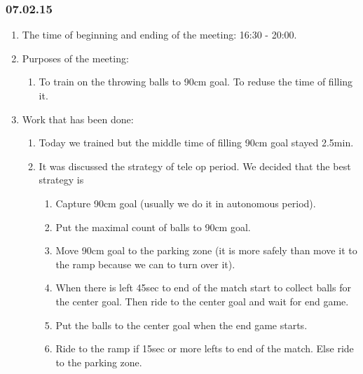 \subsubsection{07.02.15}
\begin{enumerate}
	
	\item The time of beginning and ending of the meeting: 16:30 - 20:00.
	
	\item Purposes of the meeting:
	\begin{enumerate}
		
		\item To train on the throwing balls to 90cm goal. To reduse the time of filling it.
		
	\end{enumerate}

	\item Work that has been done:
	\begin{enumerate}
		
		\item Today we trained but the middle time of filling 90cm goal stayed 2.5min.
		
		\item It was discussed the strategy of tele op period. We decided that the best strategy is
			\begin{enumerate} 
				\item Capture 90cm goal (usually we do it in autonomous period).
				 
				\item Put the maximal count of balls to 90cm goal. 
				
				\item Move 90cm goal to the parking zone (it is more safely than move it to the ramp because we can to turn over it). 
				
				\item When there is left 45sec to end of the match start to collect balls for the center goal. Then ride to the center goal and wait for end game.
				
				\item Put the balls to the center goal when the end game starts.
				
				\item Ride to the ramp if 15sec or more lefts to end of the match. Else ride to the parking zone.
				
			\end{enumerate}
		
	\end{enumerate}
	

\end{enumerate}
